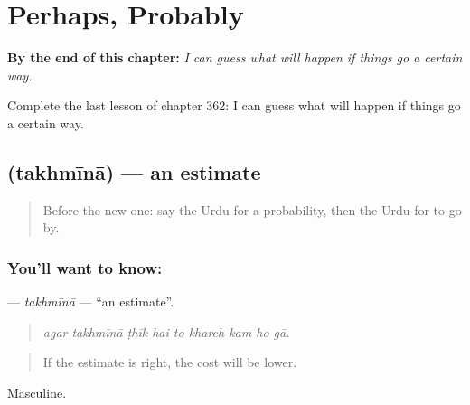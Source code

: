 
\chapter{Perhaps, Probably}
\label{ch:ur-perhaps-probably}

\begin{chapteropening}
\textbf{By the end of this chapter:} \emph{I can guess what will happen if things go a certain way.}

Complete the last lesson of chapter 362: I can guess what will happen if things go a certain way.
\end{chapteropening}

\section[\texorpdfstring{\ur{تخمینہ} (takhmīnā)}{تخمینہ (takhmīnā)}]{ (takhmīnā) — an estimate}

\label{lesson:UR-C362-takhmina}



\begin{quote}
Before the new one: say the Urdu for a probability, then the Urdu for to go by.
\end{quote}

\subsection*{You'll want to know: }
\textbf{} — \emph{takhmīnā} — \textquotedblleft{}an estimate\textquotedblright{}.

\begin{quote}
        
\end{quote}

\begin{quote}
\emph{agar takhmīnā ṭhīk hai to kharch kam ho gā.}
\end{quote}

\begin{quote}
If the estimate is right, the cost will be lower.
\end{quote}

Masculine.

